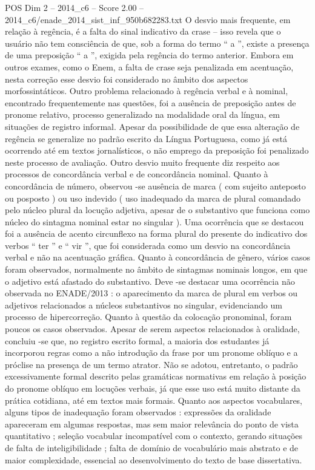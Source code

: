 \begin{textsample}{POS Dim 2 – 2014\_c6 – Score 2.00 – 2014\_c6/enade\_2014\_sist\_inf\_950b682283.txt}
O desvio mais frequente, em relação à regência, é a falta do sinal indicativo da crase – isso revela que o usuário não tem consciência de que, sob a forma do termo “ a ”, existe a presença de uma preposição “ a ”, exigida pela regência do termo anterior.
Embora em outros exames, como o Enem, a falta de crase seja penalizada em acentuação, nesta correção esse desvio foi considerado no âmbito dos aspectos morfossintáticos.
Outro problema relacionado à regência verbal e à nominal, encontrado frequentemente nas questões, foi a ausência de preposição antes de pronome relativo, processo generalizado na modalidade oral da língua, em situações de registro informal.
Apesar da possibilidade de que essa alteração de regência se generalize no padrão escrito da Língua Portuguesa, como já está ocorrendo até em textos jornalísticos, o não emprego da preposição foi penalizado neste processo de avaliação.
Outro desvio muito frequente diz respeito aos processos de concordância verbal e de concordância nominal.
Quanto à concordância de número, observou -se ausência de marca ( com sujeito anteposto ou posposto ) ou uso indevido ( uso inadequado da marca de plural comandado pelo núcleo plural da locução adjetiva, apesar de o substantivo que funciona como núcleo do sintagma nominal estar no singular ).
Uma ocorrência que se destacou foi a ausência de acento circunflexo na forma plural do presente do indicativo dos verbos “ ter ” e “ vir ”, que foi considerada como um desvio na concordância verbal e não na acentuação gráfica.
Quanto à concordância de gênero, vários casos foram observados, normalmente no âmbito de sintagmas nominais longos, em que o adjetivo está afastado do substantivo.
Deve -se destacar uma ocorrência não observada no ENADE/2013 : o aparecimento da marca de plural em verbos ou adjetivos relacionados a núcleos substantivos no singular, evidenciando um processo de hipercorreção.
Quanto à questão da colocação pronominal, foram poucos os casos observados.
Apesar de serem aspectos relacionados à oralidade, concluiu -se que, no registro escrito formal, a maioria dos estudantes já incorporou regras como a não introdução da frase por um pronome oblíquo e a próclise na presença de um termo atrator.
Não se adotou, entretanto, o padrão excessivamente formal descrito pelas gramáticas normativas em relação à posição do pronome oblíquo em locuções verbais, já que esse uso está muito distante da prática cotidiana, até em textos mais formais.
Quanto aos aspectos vocabulares, alguns tipos de inadequação foram observados : expressões da oralidade apareceram em algumas respostas, mas sem maior relevância do ponto de vista quantitativo ; seleção vocabular incompatível com o contexto, gerando situações de falta de inteligibilidade ; falta de domínio de vocabulário mais abstrato e de maior complexidade, essencial ao desenvolvimento do texto de base dissertativa.

\end{textsample}
